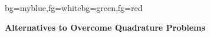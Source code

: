 {

\begin{frame}[plain]
\begin{variableblock}{}{bg=myblue,fg=white}{bg=green,fg=red}
\begin{center}
\textbf{Alternatives to Overcome Quadrature Problems}
\end{center}
\end{variableblock}
\end{frame}
}
